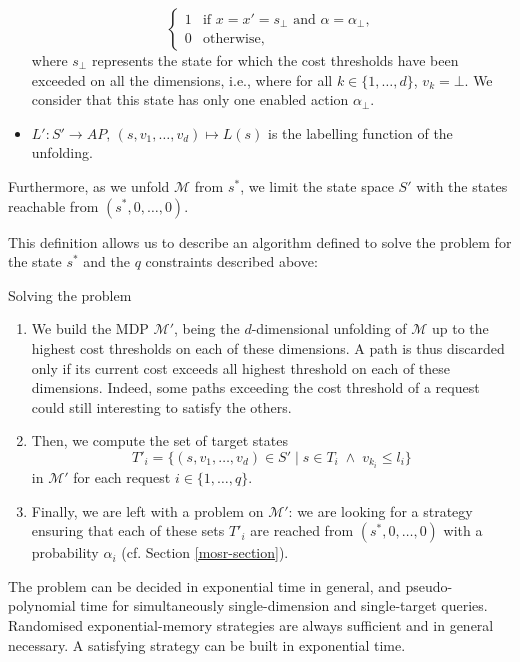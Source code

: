 \begin{definition}
\begin{itemize}
\[\begin{cases}
      1 & \text{if } x=x'=s_\bot \text{ and } \alpha = \alpha_\bot, \\
      0 & \text{otherwise,}
    \end{cases}
    \]
    where $s_\bot$ represents the state for which the cost thresholds have been exceeded on all the dimensions, i.e., where for all $k \in \{1, \dots, d\}$, $v_k = \bot$. We consider that this state has only one enabled action $\alpha_\bot$.
    \item $L': S' \rightarrow AP,\, (s, v_1, \dots, v_d) \mapsto L(s)$ is the labelling function of the unfolding.
  \end{itemize}
    Furthermore, as we unfold $\mathcal{M}$ from $s^*$, we limit the state space $S'$ with the states reachable from $(s^*, 0, \dots, 0)$.
\end{definition}

This definition allows us to describe an algorithm defined to solve the \SSPPQ{} problem for the state $s^*$ and the $q$ constraints described above:

\begin{algorithm}
\caption{Solving the \SSPPQ{} problem}\label{ssppq-algo}
\begin{enumerate}
\item We build the MDP $\mathcal{M}'$, being the $d$-dimensional unfolding of $\mathcal{M}$ up to the highest cost thresholds on each of these dimensions.
  A path is thus discarded only if its current cost exceeds all highest threshold on each of these dimensions.
  Indeed, some paths exceeding the cost threshold of a request could still interesting to satisfy the others.
  \item Then, we compute the set of target states \[T'_i = \{ (s, v_1, \dots, v_d) \in S' \; | \; s \in T_i  \; \wedge \; v_{k_i} \leq l_i \}\] in $\mathcal{M}'$ for each request $i \in \{1, \dots, q\}$.
  \item Finally, we are left with a \MOSR{} problem on $\mathcal{M}'$: we are looking for a strategy ensuring that each of these sets $T'_i$ are reached from $(s^*, 0, \dots, 0)$ with a probability $\alpha_i$ (cf. Section \ref{mosr-section}).
\end{enumerate}
\end{algorithm}

\begin{theorem}
  The \SSPPQ{} problem can be decided in exponential time in general, and pseudo-polynomial time for simultaneously single-dimension and single-target queries.
  Randomised exponential-memory strategies are always sufficient and in general necessary.
  A satisfying strategy can be built in exponential time.
\end{theorem}

